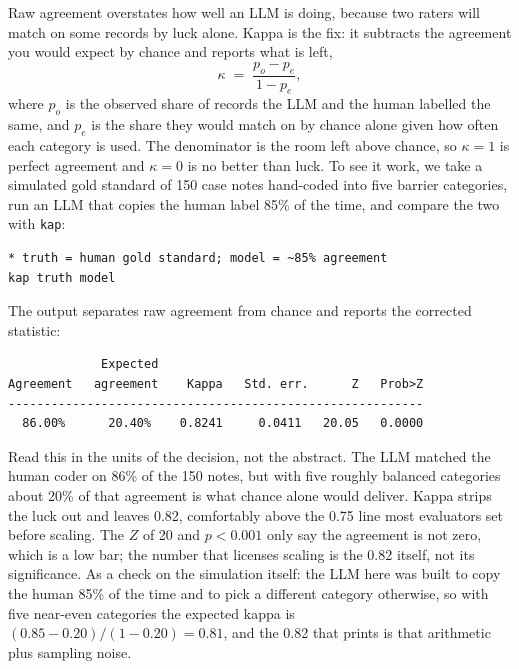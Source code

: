 \documentclass[
    a4paper,
    fontsize=10pt,
    twoside=true,
    numbers=noenddot,
]{kaobook}
\begin{document}
Raw agreement overstates how well an LLM is doing, because two raters will match on some records by luck alone. Kappa is the fix: it subtracts the agreement you would expect by chance and reports what is left,
\[
\kappa \;=\; \frac{p_o - p_e}{1 - p_e},
\]
where $p_o$ is the observed share of records the LLM and the human labelled the same, and $p_e$ is the share they would match on by chance alone given how often each category is used. The denominator is the room left above chance, so $\kappa=1$ is perfect agreement and $\kappa=0$ is no better than luck. To see it work, we take a simulated gold standard of 150 case notes hand-coded into five barrier categories, run an LLM that copies the human label 85\% of the time, and compare the two with \texttt{kap}:
\par
{\footnotesize
\begin{verbatim}
* truth = human gold standard; model = ~85% agreement
kap truth model
\end{verbatim}
}
The output separates raw agreement from chance and reports the corrected statistic:
\par
{\footnotesize
\begin{verbatim}
             Expected
Agreement   agreement    Kappa   Std. err.      Z   Prob>Z
----------------------------------------------------------
  86.00%      20.40%    0.8241     0.0411   20.05   0.0000
\end{verbatim}
}
Read this in the units of the decision, not the abstract. The LLM matched the human coder on 86\% of the 150 notes, but with five roughly balanced categories about 20\% of that agreement is what chance alone would deliver. Kappa strips the luck out and leaves 0.82, comfortably above the 0.75 line most evaluators set before scaling. The $Z$ of 20 and $p<0.001$ only say the agreement is not zero, which is a low bar; the number that licenses scaling is the 0.82 itself, not its significance. As a check on the simulation itself: the LLM here was built to copy the human 85\% of the time and to pick a different category otherwise, so with five near-even categories the expected kappa is $(0.85-0.20)/(1-0.20)=0.81$, and the 0.82 that prints is that arithmetic plus sampling noise.
\end{document}
